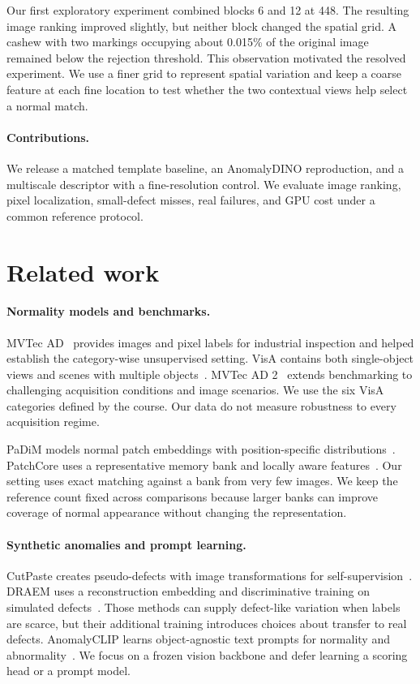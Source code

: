 \documentclass[10pt,twocolumn,letterpaper]{article}
\begin{document}
Our first exploratory experiment combined blocks 6 and 12 at 448. The resulting image ranking improved slightly, but neither block changed the spatial grid. A cashew with two markings occupying about 0.015\% of the original image remained below the rejection threshold. This observation motivated the resolved experiment. We use a finer grid to represent spatial variation and keep a coarse feature at each fine location to test whether the two contextual views help select a normal match.

\paragraph{Contributions.}
We release a matched template baseline, an AnomalyDINO reproduction, and a multiscale descriptor with a fine-resolution control. We evaluate image ranking, pixel localization, small-defect misses, real failures, and GPU cost under a common reference protocol.

\section{Related work}
\paragraph{Normality models and benchmarks.}
MVTec AD~\cite{bergmann2019mvtec} provides images and pixel labels for industrial inspection and helped establish the category-wise unsupervised setting. VisA contains both single-object views and scenes with multiple objects~\cite{zou2022visa}. MVTec AD 2~\cite{heckler2026mvtec2} extends benchmarking to challenging acquisition conditions and image scenarios. We use the six VisA categories defined by the course. Our data do not measure robustness to every acquisition regime.

PaDiM models normal patch embeddings with position-specific distributions~\cite{defard2021padim}. PatchCore uses a representative memory bank and locally aware features~\cite{roth2022patchcore}. Our setting uses exact matching against a bank from very few images. We keep the reference count fixed across comparisons because larger banks can improve coverage of normal appearance without changing the representation.

\paragraph{Synthetic anomalies and prompt learning.}
CutPaste creates pseudo-defects with image transformations for self-supervision~\cite{li2021cutpaste}. DRAEM uses a reconstruction embedding and discriminative training on simulated defects~\cite{zavrtanik2021draem}. Those methods can supply defect-like variation when labels are scarce, but their additional training introduces choices about transfer to real defects. AnomalyCLIP learns object-agnostic text prompts for normality and abnormality~\cite{zhou2024anomalyclip}. We focus on a frozen vision backbone and defer learning a scoring head or a prompt model.
\end{document}
